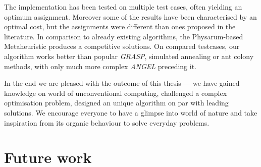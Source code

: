 The implementation has been tested on multiple test cases, often yielding an optimum assignment. Moreover some of the results have been characterised by an optimal cost, but the assignments were different than ones proposed in the literature. In comparison to already existing algorithms, the Physarum-based Metaheuristic produces a competitive solutions. On compared testcases, our algorithm works better than popular \textit{GRASP}, simulated annealing or ant colony methods, with only much more complex \textit{ANGEL} preceding it.

In the end we are pleased with the outcome of this thesis --- we have gained knowledge on world of unconventional computing, challenged a complex optimisation problem, designed an unique algorithm on par with leading solutions. We encourage everyone to have a glimpse into world of nature and take inspiration from its organic behaviour to solve everyday problems.


\section*{Future work}


